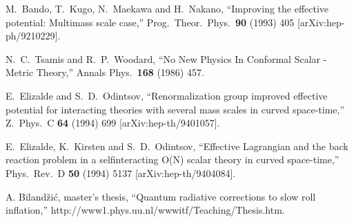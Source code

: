 \documentclass[aps,12pt,superscriptaddress,preprintnumbers,
                secnumarabic,nofootinbib,showpacs]{revtex4}
\begin{document}
\begin{thebibliography}{999}
  M.~Bando, T.~Kugo, N.~Maekawa and H.~Nakano,
  ``Improving the effective potential: Multimass scale case,''
  Prog.\ Theor.\ Phys.\  {\bf 90} (1993) 405
  [arXiv:hep-ph/9210229].

  N.~C.~Tsamis and R.~P.~Woodard,
  ``No New Physics In Conformal Scalar - Metric Theory,''
  Annals Phys.\  {\bf 168} (1986) 457.

  E.~Elizalde and S.~D.~Odintsov,
  ``Renormalization group improved effective potential for interacting theories
  with several mass scales in curved space-time,''
  Z.\ Phys.\  C {\bf 64} (1994) 699
  [arXiv:hep-th/9401057].

  E.~Elizalde, K.~Kirsten and S.~D.~Odintsov,
  ``Effective Lagrangian and the back reaction problem in a selfinteracting
  O(N) scalar theory in curved space-time,''
  Phys.\ Rev.\  D {\bf 50} (1994) 5137
  [arXiv:hep-th/9404084].

 A. Biland\v{z}i\'c, master's thesis,
``Quantum radiative corrections to slow roll inflation,''
 http://www1.phys.uu.nl/wwwitf/Teaching/Thesis.htm.

\end{thebibliography}
\end{document}
